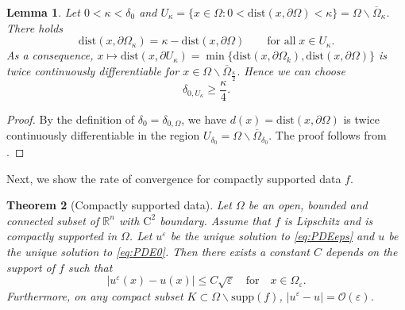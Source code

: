 \documentclass[11pt,reqno]{amsart}
\numberwithin{figure}{section}
\theoremstyle{plain}
\newtheorem{thm}{Theorem}[section]
\newtheorem{lem}[thm]{Lemma}
\theoremstyle{remark}
\numberwithin{equation}{section}
\newcommand{\R}{\mathbb{R}}
\begin{document}
\begin{lem} Let $0<\kappa < \delta_0$ and $U_\kappa = \big\{x\in \Omega: 0<\mathrm{dist}(x,\partial\Omega) < \kappa\big\} = \Omega\backslash \overline{\Omega}_\kappa$. There holds
\begin{equation*}
    \mathrm{dist}(x,\partial\Omega_\kappa) = \kappa - \mathrm{dist}(x,\partial\Omega) \qquad\text{for all}\;x\in U_\kappa.
\end{equation*}
As a consequence, $x\mapsto \mathrm{dist}(x,\partial U_\kappa) = \min\big\{\mathrm{dist}(x,\partial \Omega_k),\mathrm{dist}(x,\partial \Omega)\big\}$ is twice continuously differentiable for $x\in \Omega\backslash \overline{\Omega}_{\frac{\kappa}{2}}$. Hence we can choose 
\begin{equation}\label{e:delta_kappa}
    \delta_{0,U_\kappa} \geq \frac{\kappa}{4}.
\end{equation}
\end{lem}
\begin{proof} By the definition of $\delta_0 = \delta_{0,\Omega}$, we have $d(x) = \mathrm{dist}(x,\partial\Omega)$ is twice continuously differentiable in the region $U_{\delta_0} = \Omega\backslash \overline{\Omega}_{\delta_0}$. The proof follows from \cite[p. 355]{gilbarg_elliptic_2001}. 
\end{proof}

Next, we show the rate of convergence for compactly supported data $f$.

\begin{thm}[Compactly supported data]\label{thm:rate_doubling1} Let $\Omega$ be an open, bounded and connected subset of $\R^n$ with $\mathrm{C}^2$ boundary. Assume that $f$ is Lipschitz and is compactly supported in $\Omega$. Let $u^\varepsilon$ be the unique solution to \eqref{eq:PDEeps} and $u$ be the unique solution to \eqref{eq:PDE0}. Then there exists a constant $C$ depends on the support of $f$ such that
\begin{equation*}
|u^\varepsilon(x) - u(x)| \leq C\sqrt{\varepsilon} \quad  \text{for} \quad x\in \Omega_{\varepsilon}.
\end{equation*}
Furthermore, on any compact subset $K\subset\Omega\backslash \mathrm{supp}(f)$, $|u^\varepsilon - u| = \mathcal{O}(\varepsilon)$.
\end{thm}
\end{document}
